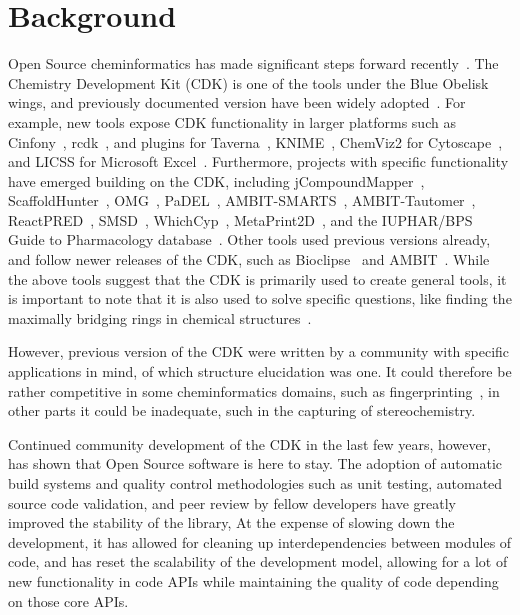 \documentclass[10pt]{bmcart}
\begin{document}
\section*{Background}

Open Source cheminformatics has made significant steps forward recently~\cite{OBoyle2011}.
The Chemistry Development Kit (CDK) is one of the tools under the Blue Obelisk wings,
and previously documented version have been widely adopted~\cite{Steinbeck2003,Steinbeck2006}.
For example, new tools expose CDK functionality in larger platforms such as Cinfony~\cite{OBoyle2008},
rcdk~\cite{Guha2007}, and plugins for Taverna~\cite{Truszkowski2011},
KNIME~\cite{Beisken2013}, ChemViz2 for Cytoscape~\cite{ChemViz2}, and LICSS for
Microsoft Excel~\cite{Lawson2012}.
Furthermore, projects with specific functionality have emerged building on the CDK, including
jCompoundMapper~\cite{Hinselmann2011}, ScaffoldHunter~\cite{wetzel2009interactive}, OMG~\cite{Peironcely2012},
PaDEL~\cite{yap2011padel}, AMBIT-SMARTS~\cite{jeliazkova2011ambitsmarts}, AMBIT-Tautomer~\cite{kochev2013ambit},
ReactPRED~\cite{ReactPRED}, SMSD~\cite{Rahman2009,Rahman2014,Rahman2016}, WhichCyp~\cite{Rostkowski2013},
MetaPrint2D~\cite{Carlsson2010}, and the IUPHAR/BPS Guide to Pharmacology database~\cite{Southan2016}.
Other tools used previous versions already, and follow
newer releases of the CDK, such as Bioclipse~\cite{spjuth2007bioclipse,
spjuth2009bioclipse} and AMBIT~\cite{jeliazkova2011ambit}. While the above
tools suggest that the CDK is primarily used to create general tools, it is
important to note that it is also used to solve specific questions, like finding
the maximally bridging rings in chemical structures~\cite{Marth2015}.

However, previous version of the CDK were written by a community with specific applications
in mind, of which structure elucidation was one. It could therefore be rather competitive
in some cheminformatics domains, such as fingerprinting~\cite{Clark2014,Cannon2006}, in other parts
it could be inadequate, such in the capturing of stereochemistry.

Continued community development of the CDK in the last few years, however, has shown that
Open Source software is here to stay. The adoption of automatic build systems and
quality control methodologies such as unit testing, automated source code validation,
and peer review by fellow developers have greatly improved the stability of the library,
At the expense of slowing down the development, it has allowed for cleaning up interdependencies
between modules of code, and has reset the scalability of the development model,
allowing for a lot of new functionality in code APIs while maintaining the quality
of code depending on those core APIs.
\end{document}
